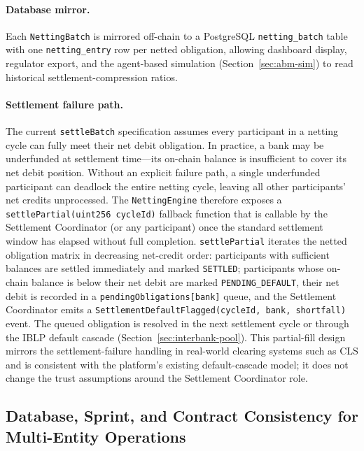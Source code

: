 \documentclass[12pt,a4paper]{report}
\begin{document}
\paragraph{Database mirror.}
Each \texttt{NettingBatch} is mirrored off-chain to a PostgreSQL \texttt{netting\_batch} table with one \texttt{netting\_entry} row per netted obligation, allowing dashboard display, regulator export, and the agent-based simulation (Section~\ref{sec:abm-sim}) to read historical settlement-compression ratios.

\paragraph{Settlement failure path.}
The current \texttt{settleBatch} specification assumes every participant in a netting cycle can fully meet their net debit obligation.  In practice, a bank may be underfunded at settlement time---its on-chain balance is insufficient to cover its net debit position.  Without an explicit failure path, a single underfunded participant can deadlock the entire netting cycle, leaving all other participants' net credits unprocessed.  The \texttt{NettingEngine} therefore exposes a \texttt{settlePartial(uint256 cycleId)} fallback function that is callable by the Settlement Coordinator (or any participant) once the standard settlement window has elapsed without full completion.  \texttt{settlePartial} iterates the netted obligation matrix in decreasing net-credit order: participants with sufficient balances are settled immediately and marked \texttt{SETTLED}; participants whose on-chain balance is below their net debit are marked \texttt{PENDING\_DEFAULT}, their net debit is recorded in a \texttt{pendingObligations[bank]} queue, and the Settlement Coordinator emits a \texttt{SettlementDefaultFlagged(cycleId, bank, shortfall)} event.  The queued obligation is resolved in the next settlement cycle or through the IBLP default cascade (Section~\ref{sec:interbank-pool}).  This partial-fill design mirrors the settlement-failure handling in real-world clearing systems such as CLS and is consistent with the platform's existing default-cascade model; it does not change the trust assumptions around the Settlement Coordinator role.

\subsection{Database, Sprint, and Contract Consistency for Multi-Entity Operations}
\label{sec:multi-entity-consistency}
\end{document}
